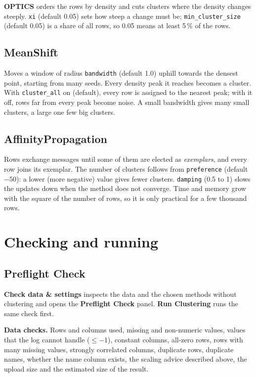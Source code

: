 \documentclass[11pt,a4paper]{article}
\newcommand{\ui}[1]{\textsf{\textbf{#1}}}   %
\newcommand{\param}[1]{\texttt{#1}}         %
\begin{document}
\textbf{OPTICS} orders the rows by density and cuts clusters where the density changes steeply. \param{xi} (default
0.05) sets how steep a change must be; \param{min\_cluster\_size} (default 0.05) is a share of all rows, so 0.05
means at least 5\,\% of the rows.

\subsection{MeanShift}

Moves a window of radius \param{bandwidth} (default 1.0) uphill towards the densest point, starting from many seeds.
Every density peak it reaches becomes a cluster. With \param{cluster\_all} on (default), every row is assigned to
the nearest peak; with it off, rows far from every peak become noise. A small bandwidth gives many small clusters, a
large one few big clusters.

\subsection{AffinityPropagation}

Rows exchange messages until some of them are elected as \emph{exemplars}, and every row joins its exemplar. The
number of clusters follows from \param{preference} (default $-50$): a lower (more negative) value gives fewer
clusters. \param{damping} (0.5 to 1) slows the updates down when the method does not converge. Time and memory grow
with the square of the number of rows, so it is only practical for a few thousand rows.

\section{Checking and running}

\subsection{Preflight Check}

\ui{Check data \& settings} inspects the data and the chosen methods without clustering and opens the
\ui{Preflight Check} panel. \ui{Run Clustering} runs the same check first.

\textbf{Data checks.} Rows and columns used, missing and non-numeric values, values that the log cannot handle
($\le -1$), constant columns, all-zero rows, rows with many missing values, strongly correlated columns, duplicate
rows, duplicate names, whether the name column exists, the scaling advice described above, the upload size and the
estimated size of the result.
\end{document}
